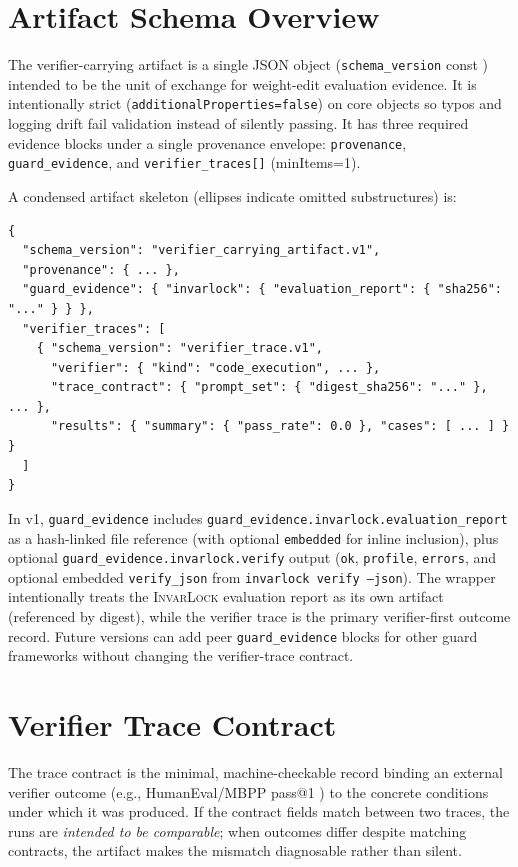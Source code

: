 \documentclass{article} %
\newcommand{\invarlock}{\textsc{InvarLock}\xspace}
\begin{document}
\section{Artifact Schema Overview}
The verifier-carrying artifact is a single JSON object
(\texttt{schema\_version} const ) intended to be the unit of exchange for
weight-edit evaluation evidence.
It is intentionally strict (\texttt{additionalProperties=false}) on core objects so typos and
logging drift fail validation instead of silently passing.
It has three required evidence blocks under a single provenance envelope:
\texttt{provenance}, \texttt{guard\_evidence}, and \texttt{verifier\_traces[]} (minItems=1).

A condensed artifact skeleton (ellipses indicate omitted substructures) is:
\begin{lstlisting}
{
  "schema_version": "verifier_carrying_artifact.v1",
  "provenance": { ... },
  "guard_evidence": { "invarlock": { "evaluation_report": { "sha256": "..." } } },
  "verifier_traces": [
    { "schema_version": "verifier_trace.v1",
      "verifier": { "kind": "code_execution", ... },
      "trace_contract": { "prompt_set": { "digest_sha256": "..." }, ... },
      "results": { "summary": { "pass_rate": 0.0 }, "cases": [ ... ] } }
  ]
}
\end{lstlisting}

In v1, \texttt{guard\_evidence} includes \texttt{guard\_evidence.invarlock.evaluation\_report} as a
hash-linked file reference (with optional \texttt{embedded} for inline inclusion), plus optional
\texttt{guard\_evidence.invarlock.verify} output (\texttt{ok}, \texttt{profile}, \texttt{errors}, and
optional embedded \texttt{verify\_json} from \texttt{invarlock verify --json}).
The wrapper intentionally treats the \invarlock evaluation report as its own artifact (referenced
by digest), while the verifier trace is the primary verifier-first outcome record.
Future versions can add peer \texttt{guard\_evidence} blocks for other guard frameworks without
changing the verifier-trace contract.

\section{Verifier Trace Contract}
The trace contract is the minimal, machine-checkable record binding an external verifier outcome
(e.g., HumanEval/MBPP pass@1 \citep{chen2021humaneval,austin2021mbpp}) to the concrete
conditions under which it was produced.
If the contract fields match between two traces, the runs are \emph{intended to be comparable}; when
outcomes differ despite matching contracts, the artifact makes the mismatch diagnosable rather than
silent.
\end{document}
